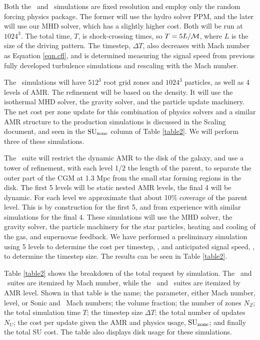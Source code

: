 Both the \nameTurbulence\ and \nameCMB\ simulations are fixed resolution and
employ only the random forcing physics package.  The former will use the hydro solver
PPM, and the later will use our MHD solver, which has a slightly higher cost.  Both will be
run at $1024^3$.  The total time, $T$, is  shock-crossing times, so $T =
5 L/\mathcal{M}$, where $L$ is the size of the driving pattern.  The
timestep, $\Delta T$, also decreases with Mach number as Equation \ref{eqn.cfl},
and is determined measuring the signal speed \vsignal from
previous fully developed turbulence simulations and rescaling with the Mach
number.

The \nameCores\ simulations will have $512^3$ root grid zones and $1024^3$
particles, as well as 4 levels of AMR.  The refinement will be based on the
density.  It will use the isothermal MHD solver, the gravity solver, and the
particle update machinery.  The net cost per zone update for this combination of
physics solvers and a similar AMR structure to the production simulations is
discussed in the Scaling document, and seen in the $\rm{SU}_{\rm{zone}}$ column of Table
\ref{table2}.  We will perform three of these simulations.

The \nameGalaxies\ suite will restrict the dynamic AMR to the disk of the galaxy, and
use a tower of refinement, with each level 1/2 the length of the parent, to separate the outer
part of the CGM at 1.3 Mpc from the small star forming regions in the disk.  The
first 5 levels will be static nested AMR levels, the final 4 will be dynamic.
For each level we approximate that about 10\% coverage of the parent level.
This is by construction for the first 5, and from experience with similar
simulations for the final 4.  These simulations will use the MHD solver, the
gravity solver, the particle machinery for the star particles, heating and
cooling of the gas, and supernovae feedback.  We have performed a preliminary
simulation using 5 levels to determine the cost per timestep, \suzu, and
anticipated signal speed, \vsignal, to determine the timestep size. The results
can be seen in Table \ref{table2}. 

Table \ref{table2} shows the breakdown of the total request by simulation.  The
\nameTurbulence\ and \nameCMB\ suites are itemized by Mach number, while the
\nameCores\ and \nameGalaxies\ suites are itemized by AMR level.  Shown in that
table is the name; the parameter, either Mach number, level, or Sonic and \alf\
Mach numbers;  the volume fraction; the number of zones $N_Z$; the total
simulation time $T$; the timestep size $\Delta T$; the total number of
updates $N_U$; the cost per update given the AMR and physics usage, $\rm{SU}_{\rm{zone}}$; and
finally the total SU cost.  The table also displays disk usage for these
simulations.

